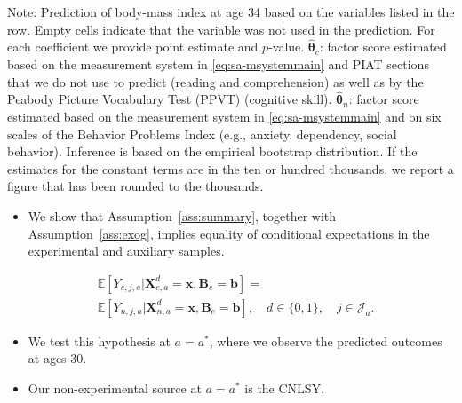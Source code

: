 \documentclass[static]{JJH-Beamer}
\begin{document}
\begin{frame}
\begin{table}[H]
\begin{center}
\end{center}
\tiny \flushleft
Note: Prediction of body-mass index at age 34 based on the variables listed in the row. Empty cells indicate that the variable was not used in the prediction. For each coefficient we provide point estimate and $p$-value. $\hat{\bm{\theta}}_{c}$: factor score estimated based on the measurement system in \eqref{eq:sa-msystemmain} and PIAT sections that we do not use to predict (reading and comprehension) as well as by the Peabody Picture Vocabulary Test (PPVT) (cognitive skill). $\hat{\bm{\theta}}_{n}$: factor score estimated based on the measurement system in \eqref{eq:sa-msystemmain} and on six scales of the Behavior Problems Index (e.g., anxiety, dependency, social behavior). Inference is based on the empirical bootstrap distribution. If the estimates for the constant terms are in the ten or hundred thousands, we report a figure that has been rounded to the thousands.\\
\end{table}

\end{frame}

\begin{frame}

\begin{itemize}
\item We show that Assumption~\ref{ass:summary}, together with Assumption~\ref{ass:exog}, implies equality of conditional expectations in the experimental and auxiliary samples.
\end{itemize}

\begin{align}
&\mathbb{E} \left[ Y_{e,j,a} | \bm{X}^d_{e,a} = \bm{x}, \bm{B}_e = \bm{b} \right] = \\
&\mathbb{E} \left[ Y_{n,j,a} | \bm{X}^d_{n,a} = \bm{x}, \bm{B}_e = \bm{b} \right], \quad d \in \{0,1\}, \quad j \in \mathcal{J}_a. \nonumber
\end{align}

\begin{itemize}
\item We test this hypothesis at $a = a^*$, where we observe the predicted outcomes at ages 30.
\item Our non-experimental source at $a = a^*$ is the CNLSY.
\end{itemize}

\end{frame}
\end{document}
